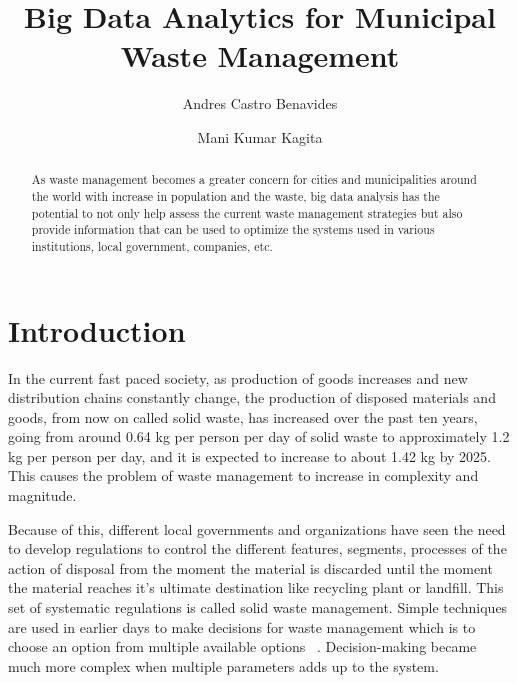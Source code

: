 \documentclass[sigconf]{acmart}
\begin{document}
\title{Big Data Analytics for Municipal Waste Management}

\author{Andres Castro Benavides}

\author{Mani Kumar Kagita}
\renewcommand{\shortauthors}{B. Trovato et al.}


\begin{abstract}
As waste management becomes a greater concern for cities and municipalities around the world with increase in population and the waste, big data analysis has the potential to not only help assess the current waste management strategies but also provide information that can be used to optimize the systems used in various institutions, local government, companies, etc.

\end{abstract}



\maketitle

\section{Introduction}


In the current fast paced society, as production of goods increases and new distribution chains constantly change, the production of disposed materials and goods, from now on called solid waste, has increased over the past ten years, going from around 0.64 kg per person per day of solid waste to approximately 1.2 kg per person per day,  and it is expected to increase to about 1.42 kg by 2025.
~\cite{hoornweg2012} This causes the problem of waste management to increase in complexity and magnitude.

Because of this, different local governments and organizations have seen the need to develop regulations to control the different features, segments, processes of the action of disposal from the moment the material is discarded until the moment the material reaches it's ultimate destination like recycling plant or landfill. This set of systematic regulations is called solid waste management. Simple techniques are used in earlier days to make decisions for waste management which is to choose an option from multiple available options  ~\cite{akbarpour2016}. Decision-making became much more complex when multiple parameters adds up to the system.
\end{document}
